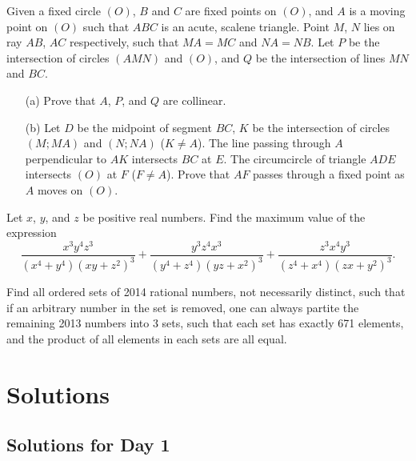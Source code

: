 \documentclass[11pt]{article}
\begin{document}
        \begin{exercise}
            Given a fixed circle \((O)\), \(B\) and \(C\) are fixed points on \((O)\), and \(A\) is a moving point on \((O)\) such that \(ABC\) is an acute, scalene triangle. Point \(M\), \(N\) lies on ray \(AB\), \(AC\) respectively, such that \(MA = MC\) and \(NA = NB\). Let \(P\) be the intersection of circles \((AMN)\) and \((O)\), and \(Q\) be the intersection of lines \(MN\) and \(BC\).
            \begin{enumerate}
                \item[(a)] Prove that \(A\), \(P\), and \(Q\) are collinear.
                \item[(b)] Let \(D\) be the midpoint of segment \(BC\), \(K\) be the intersection of circles \((M;MA)\) and \((N;NA)\) (\(K \neq A\)). The line passing through \(A\) perpendicular to \(AK\) intersects \(BC\) at \(E\). The circumcircle of triangle \(ADE\) intersects \((O)\) at \(F\) (\(F \neq A\)). Prove that \(AF\) passes through a fixed point as \(A\) moves on \((O)\).
            \end{enumerate}
        \end{exercise}
    
        \boom
    
        \begin{exercise}
            Let \(x\), \(y\), and \(z\) be positive real numbers. Find the maximum value of the expression
            \[\frac{x^3y^4z^3}{(x^4 + y^4)(xy + z^2)^3} + \frac{y^3z^4x^3}{(y^4 + z^4)(yz + x^2)^3} + \frac{z^3x^4y^3}{(z^4 + x^4)(zx + y^2)^3}.\]
        \end{exercise}
    
        \boom
    
        \begin{exercise}
            Find all ordered sets of 2014 rational numbers, not necessarily distinct, such that if an arbitrary number in the set is removed, one can always partite the remaining 2013 numbers into 3 sets, such that each set has exactly 671 elements, and the product of all elements in each sets are all equal.
        \end{exercise}

    \newpage

\section{Solutions}

    \subsection{Solutions for Day 1}
\end{document}
